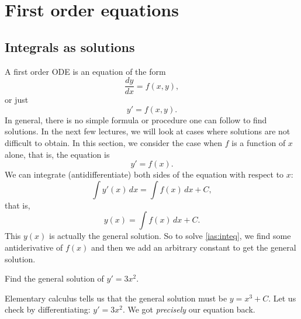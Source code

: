\chapter{First order equations} \label{fo:chapter}


\section{Integrals as solutions}
\label{integralsols:section}


A first order ODE is an equation of the form
\begin{equation*}
\frac{dy}{dx} = f(x,y) ,
\end{equation*}
or just
\begin{equation*}
y' = f(x,y) .
\end{equation*}
In general, there is no simple formula or procedure one can follow to find
solutions.
In the next few lectures, we will look at cases where solutions are not
difficult to obtain.
In this section, we consider the case when $f$ is a function of $x$ alone,
that is, the equation is
\begin{equation} \label{ias:inteq}
y' = f(x) .
\end{equation}
We can integrate (antidifferentiate) both sides of the equation with respect to $x$:
\begin{equation*}
\int y'(x) \,dx = \int f(x) \,dx + C ,
\end{equation*}
that is,
\begin{equation*}
y(x) = \int f(x) \,dx + C .
\end{equation*}
This $y(x)$ is actually the general solution.
So to solve \eqref{ias:inteq},
we find some antiderivative of $f(x)$
and then we add an arbitrary constant to get the general solution.

\begin{example}
Find the general solution of $y' = 3 x^2$.

Elementary calculus tells us
that the general solution must be $y = x^3 + C$.  Let us check by
differentiating:
$y' = 3x^2$.  We got \emph{precisely} our equation back.
\end{example}

